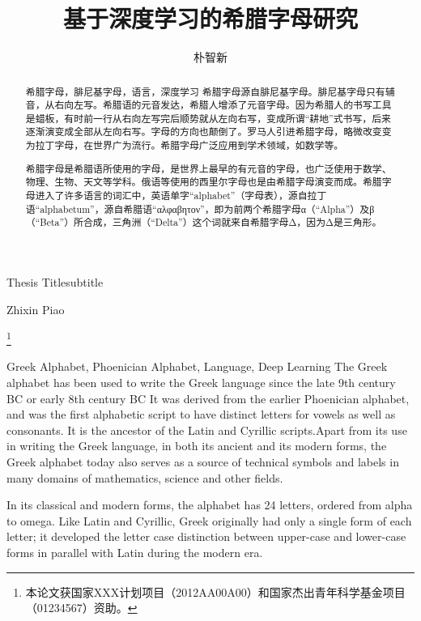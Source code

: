 \documentclass[bachelor]{seuthesis} %
\begin{document}

\title{基于深度学习的希腊字母研究}{}{Thesis Title}{subtitle}
\author{朴智新}{Zhixin Piao}

\address{河海院2楼}
\thanks{本论文获国家XXX计划项目（2012AA00A00）和国家杰出青年科学基金项目（01234567）资助。}
\maketitle

\begin{abstract}{希腊字母，腓尼基字母，语言，深度学习}
希腊字母源自腓尼基字母。腓尼基字母只有辅音，从右向左写。希腊语的元音发达，希腊人增添了元音字母。因为希腊人的书写工具是蜡板，有时前一行从右向左写完后顺势就从左向右写，变成所谓“耕地”式书写，后来逐渐演变成全部从左向右写。字母的方向也颠倒了。罗马人引进希腊字母，略微改变变为拉丁字母，在世界广为流行。希腊字母广泛应用到学术领域，如数学等。

希腊字母是希腊语所使用的字母，是世界上最早的有元音的字母，也广泛使用于数学、物理、生物、天文等学科。俄语等使用的西里尔字母也是由希腊字母演变而成。希腊字母进入了许多语言的词汇中，英语单字“alphabet”（字母表），源自拉丁语“alphabetum”，源自希腊语“αλφαβητον”，即为前两个希腊字母α（“Alpha”）及β（“Beta”）所合成，三角洲（“Delta”）这个词就来自希腊字母Δ，因为Δ是三角形。
\end{abstract}

\begin{englishabstract}{Greek Alphabet, Phoenician Alphabet, Language, Deep Learning}
The Greek alphabet has been used to write the Greek language since the late 9th century BC or early 8th century BC It was derived from the earlier Phoenician alphabet, and was the first alphabetic script to have distinct letters for vowels as well as consonants. It is the ancestor of the Latin and Cyrillic scripts.Apart from its use in writing the Greek language, in both its ancient and its modern forms, the Greek alphabet today also serves as a source of technical symbols and labels in many domains of mathematics, science and other fields.

In its classical and modern forms, the alphabet has 24 letters, ordered from alpha to omega. Like Latin and Cyrillic, Greek originally had only a single form of each letter; it developed the letter case distinction between upper-case and lower-case forms in parallel with Latin during the modern era.
\end{englishabstract}
\end{document}
